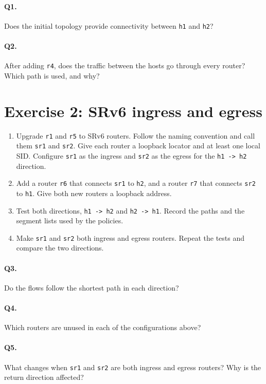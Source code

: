 \documentclass[11pt,letterpaper]{report}
\newcommand{\code}[1]{\texttt{#1}}
\begin{document}
\paragraph{Q1.} Does the initial topology provide connectivity between
\code{h1} and \code{h2}?

\paragraph{Q2.} After adding \code{r4}, does the traffic between the hosts go
through every router?  Which path is used, and why?

\section{Exercise 2: SRv6 ingress and egress}

\begin{enumerate}
  \item Upgrade \code{r1} and \code{r5} to SRv6 routers.  Follow the naming
        convention and call them \code{sr1} and \code{sr2}.  Give each router a
        loopback locator and at least one local SID.  Configure \code{sr1} as
        the ingress and \code{sr2} as the egress for the \code{h1 -> h2}
        direction.
  \item Add a router \code{r6} that connects \code{sr1} to \code{h2}, and a
        router \code{r7} that connects \code{sr2} to \code{h1}.  Give both new
        routers a loopback address.
  \item Test both directions, \code{h1 -> h2} and \code{h2 -> h1}.  Record the
        paths and the segment lists used by the policies.
  \item Make \code{sr1} and \code{sr2} both ingress and egress routers.  Repeat
        the tests and compare the two directions.
        
\end{enumerate}

\paragraph{Q3.} Do the flows follow the shortest path in each direction?

\paragraph{Q4.} Which routers are unused in each of the configurations above?

\paragraph{Q5.} What changes when \code{sr1} and \code{sr2} are both ingress
and egress routers?  Why is the return direction affected?
\end{document}
